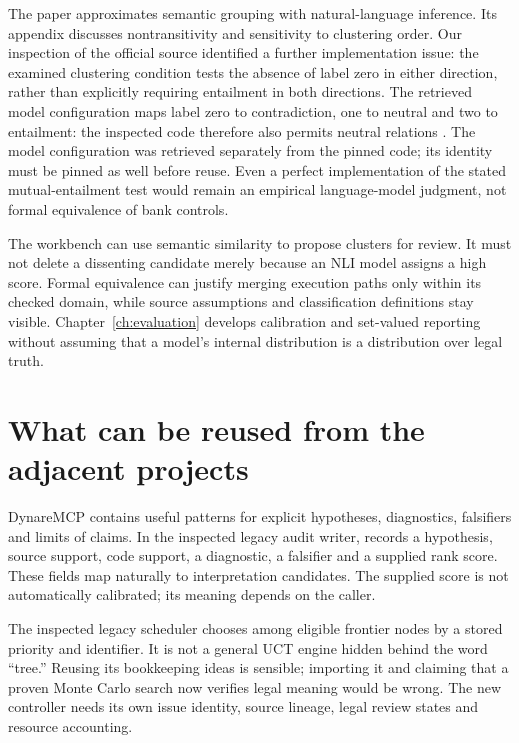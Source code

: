 
The paper approximates semantic grouping with natural-language inference. Its
appendix discusses nontransitivity and sensitivity to clustering order. Our
inspection of the official source identified a further implementation issue: the
examined clustering condition tests the absence of label zero in either direction,
rather than explicitly requiring entailment in both directions. The retrieved model configuration maps label zero to contradiction, one to
neutral and two to entailment: the inspected code therefore also permits neutral
relations \citep{semanticcode2023,debertaconfig}. The model configuration was retrieved separately from the pinned code;
its identity must be pinned as well before reuse. Even a
perfect implementation of the stated mutual-entailment test would remain an
empirical language-model judgment, not formal equivalence of bank controls.

The workbench can use semantic similarity to propose clusters for review. It
must not delete a dissenting candidate merely because an NLI model assigns a
high score. Formal equivalence can justify merging execution paths only within
its checked domain, while source assumptions and classification definitions stay
visible. Chapter~\ref{ch:evaluation} develops calibration and set-valued reporting
without assuming that a model's internal distribution is a distribution over
legal truth.

\section{What can be reused from the adjacent projects}
\label{merge:M05:10}


DynareMCP contains useful patterns for explicit hypotheses, diagnostics,
falsifiers and limits of claims. In the inspected legacy audit writer,
 records a hypothesis, source support, code support,
a diagnostic, a falsifier and a supplied rank score. These fields map naturally
to interpretation candidates. The supplied score is not automatically calibrated;
its meaning depends on the caller.

The inspected legacy scheduler chooses among eligible frontier nodes by a stored
priority and identifier. It is not a general UCT engine hidden behind the word
``tree.'' Reusing its bookkeeping ideas is sensible; importing it and claiming
that a proven Monte Carlo search now verifies legal meaning would be wrong. The
new controller needs its own issue identity, source lineage, legal review states
and resource accounting.

